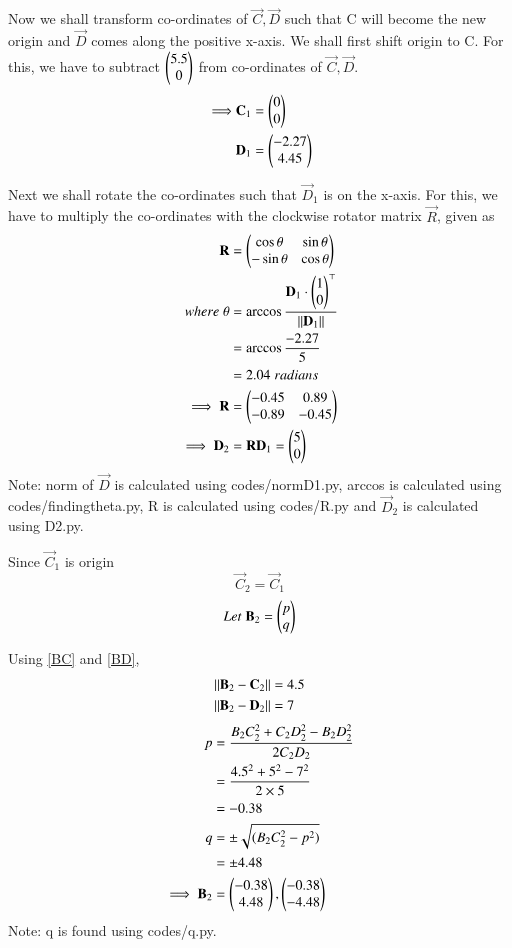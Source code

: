\documentclass[journal,12pt,twocolumn]{IEEEtran}
\begin{document}
Now we shall transform co-ordinates of $\vec{C}, \vec{D}$ such that C will become the new origin and $\vec{D}$ comes along the positive x-axis. We shall first shift origin to C. For this, we have to subtract $\begin{pmatrix}5.5\\0\end{pmatrix}$ from co-ordinates of $\vec{C}, \vec{D}$.
\begin{align}
    \implies &\mathbf{C}_1 = \begin{pmatrix}0\\0\end{pmatrix}\\
    &\mathbf{D}_1 = \begin{pmatrix}-2.27\\4.45\end{pmatrix}
\end{align}

Next we shall rotate the co-ordinates such that $\vec{D}_1$ is on the x-axis. For this, we have to multiply the co-ordinates with the clockwise rotator matrix $\vec{R}$, given as
\begin{align}
    \mathbf{R} &= \begin{pmatrix}\cos{\theta}& \sin{\theta}\\ -\sin{\theta} & \cos{\theta}\end{pmatrix}\\
    where\; \theta &= \arccos{\dfrac{\mathbf{D}_1\cdot \ensuremath{\begin{pmatrix}1\\0\end{pmatrix}}^\top}{\lVert\mathbf{D}_1\rVert}}\\
    &= \arccos{\dfrac{-2.27}{5}}\\
    &= 2.04 \;radians\\
    \implies \mathbf{R} &= \begin{pmatrix}-0.45 & 0.89\\-0.89 & -0.45\end{pmatrix}\\
    \implies \mathbf{D}_2 &= \mathbf{R}\mathbf{D}_1 = \begin{pmatrix}5\\0\end{pmatrix}
\end{align}
Note: norm of $\vec{D}$ is calculated using codes/norm\textunderscore D1.py, arccos is calculated using codes/finding\textunderscore theta.py, R is calculated using codes/R.py and $\vec{D}_2$ is calculated using D2.py.

Since $\vec{C}_1$ is origin
\begin{equation}
    \vec{C}_2 = \vec{C}_1
\end{equation}
\begin{equation}
    Let\; \mathbf{B}_2 = \begin{pmatrix}p\\q\end{pmatrix}
\end{equation}

Using \ref{BC} and \ref{BD},
\begin{align}
    \lVert\mathbf{B}_2-\mathbf{C}_2\rVert &= 4.5\\
    \lVert\mathbf{B}_2-\mathbf{D}_2\rVert &= 7
\end{align}
\begin{align}
    p &= \dfrac{B_2C_2^2+C_2D_2^2-B_2D_2^2}{2C_2D_2}\\
      &= \dfrac{4.5^2+5^2-7^2}{2\times 5}\\
      &= -0.38\\
    q &= \pm \sqrt{(B_2C_2^2-p^2)}\\
      &= \pm 4.48\\
    \implies \mathbf{B}_2 &= \begin{pmatrix}-0.38\\4.48\end{pmatrix}, \begin{pmatrix}-0.38\\-4.48\end{pmatrix}
\end{align}
Note: q is found using codes/q.py. 
\end{document}

